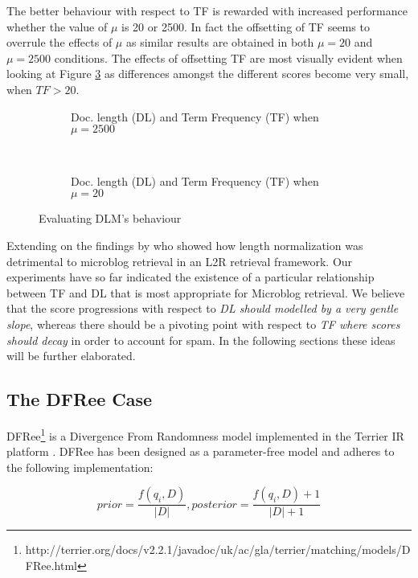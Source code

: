The better behaviour with respect to TF is rewarded with increased performance whether the value of $\mu$ is 20 or 2500. In fact the offsetting of TF seems to overrule the effects of $\mu$ as similar results are obtained in both $\mu=20$ and $\mu=2500$ conditions. The effects of offsetting TF are most visually evident when looking at Figure \ref{dlmfigureTFDL20} as differences amongst the different scores become very small, when $TF > 20$. 


\begin{figure}
      	\begin{subfigure}[b]{0.5\textwidth}
          \centering
          \caption{Doc. length (DL) and Term Frequency (TF) when $\mu = 2500$}
          
          \label{dlmfigureTFDL2500}          
        \end{subfigure} 
        ~
 		\begin{subfigure}[b]{0.5\textwidth}
          \centering
          \caption{Doc. length (DL) and Term Frequency (TF) when $\mu = 20$}
          
          \label{dlmfigureTFDL20}          
        \end{subfigure} 
        \caption{Evaluating DLM's behaviour}
\end{figure}

Extending on the findings by \cite{naveed2011searching} who showed how length normalization was detrimental to microblog retrieval in an L2R retrieval framework. Our experiments have so far indicated the existence of a particular relationship between TF and DL that is most appropriate for Microblog retrieval. We believe that the score progressions with respect to \textit{DL should modelled by a very gentle slope}, whereas there should be a pivoting point with respect to \textit{TF where scores should decay} in order to account for spam. In the following sections these ideas will be further elaborated.

\subsection{The DFRee Case}
DFRee\footnote{http://terrier.org/docs/v2.2.1/javadoc/uk/ac/gla/terrier/matching/models/DFRee.html} is a Divergence From Randomness model implemented in the Terrier IR platform \cite{terrierir}. DFRee has been designed as a parameter-free model and adheres to the following implementation:

\begin{equation}
prior = \frac{f(q_i, D)}{|D|}, posterior = \frac{f(q_i, D)+1}{|D|+1} 
\end{equation}

